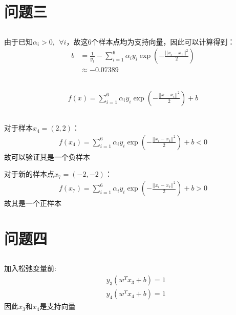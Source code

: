 \documentclass[12pt, a4paper]{article}
\begin{document}
\section{问题三}


\subsection{}

由于已知$\alpha_i > 0, \ \ \forall i$，故这6个样本点均为支持向量，因此可以计算得到：
\begin{align*}
    b&=\frac{1}{y_1}-\sum_{i=1}^{6}\alpha_i y_i \exp(-\frac{||x_i-x_1||^2}{2}) \\
    &\approx -0.07389
\end{align*}

\subsection{}

\begin{align*}
    f(x)=\sum_{i=1}^6 \alpha_i y_i \exp(-\frac{||x-x_i||^2}{2}) +b
\end{align*}

\subsection{}

对于样本$x_4=(2,2)$：
\begin{align*}
    f(x_4)=\sum_{i=1}^{6}\alpha_i y_i \exp(-\frac{||x_i-x_4||^2}{2})+b<0 
\end{align*}
故可以验证其是一个负样本

对于新的样本点$x_7=(-2,-2)$：
\begin{align*}
    f(x_7)=\sum_{i=1}^{6}\alpha_i y_i \exp(-\frac{||x_i-x_7||^2}{2})+b>0
\end{align*}
故其是一个正样本


\section{问题四}


\subsection{}

加入松弛变量前:
\begin{align*}
    &y_3(w^T x_3+b)=1\\
    &y_4(w^T x_4+b)=1
\end{align*}
因此$x_3$和$x_4$是支持向量
\end{document}
